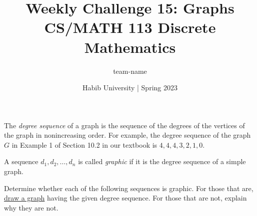\documentclass[a4paper,addpoints]{exam}
\title{Weekly Challenge 15: Graphs\\CS/MATH 113 Discrete Mathematics}
\author{team-name}  %
\date{Habib University | Spring 2023}
\begin{document}
\maketitle
\thispagestyle{empty}

\begin{questions}


  The \textit{degree sequence} of a graph is the sequence of the degrees of the vertices of the graph in nonincreasing order. For example, the degree sequence of the graph $G$ in Example 1 of Section 10.2 in our textbook is $4,4,4,3,2,1,0$.

  A sequence $d_1 , d_2 , \ldots , d_n$ is called \textit{graphic} if it is the degree sequence of a simple graph.

  Determine whether each of the following sequences is graphic. For those that are, \href{https://www.baeldung.com/cs/latex-drawing-graphs}{draw a graph} having the given degree sequence. For those that are not, explain why they are not.

  \begin{solution}
    
  \end{solution}
  
\end{questions}
\end{document}
